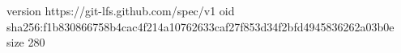 version https://git-lfs.github.com/spec/v1
oid sha256:f1b830866758b4cac4f214a10762633caf27f853d34f2bfd4945836262a03b0e
size 280
